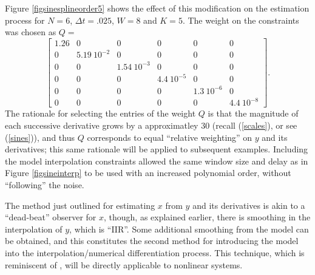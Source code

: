 Figure \ref{figsinesplineorder5} shows the
effect of this modification on the estimation process for $N=6$, $\Delta t = .025$, 
$W=8$ and $K=5$.  The weight on the constraints was chosen as $ Q =$
\begin{equation}
\left[ \begin{array}{cccccc} 1.26 & 0 & 0 & 0 & 0 & 0\\
0  & 5.19 \ 10^{-2}  & 0 & 0 & 0 & 0 \\
0 & 0 & 1.54 \ 10^{-3} & 0 & 0 & 0 \\
0 & 0 & 0 & 4.4 \ 10^{-5} & 0 & 0 \\
0 & 0 & 0 & 0 & 1.3 \ 10^{-6} & 0 \\
0 & 0 & 0 & 0 & 0 & 4.4 \ 10^{-8}
\end{array} \right].
\end{equation}
The rationale for
selecting the entries of the
weight $Q$ is that the magnitude of each successive derivative grows by a
approximatley
30 (recall (\ref{scales}), or see (\ref{sines})), 
and thus $Q$ corresponds to equal ``relative
weighting'' on $y$ and its derivatives;
this same rationale will be applied to subsequent examples. Including the model
interpolation constraints allowed the same window size and delay as in Figure
\ref{figsineinterp} to be used with an increased polynomial order, without
``following'' the noise.


The method just outlined for estimating $x$ from $y$ and its derivatives is akin to
a ``dead-beat'' observer for $x$, though, as explained
earlier, there is smoothing in the
interpolation of $y$, which is ``IIR''.  Some additional smoothing from the
model can be obtained, and this constitutes the second method for introducing
the model into the interpolation/numerical differentiation process.
This technique, which is reminiscent of
\cite{grizzle1990b,moraal1992}, 
will be
directly applicable to nonlinear systems.  

